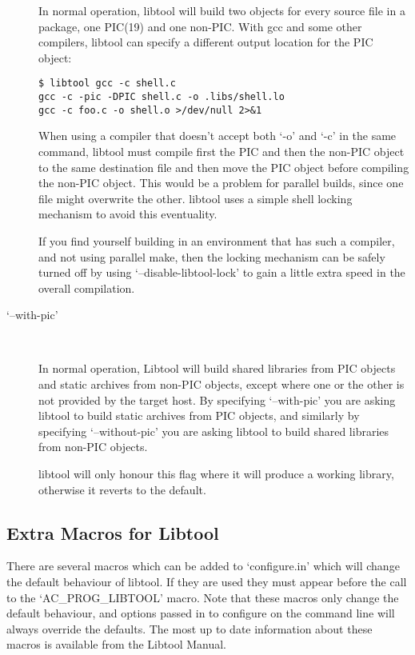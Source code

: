 \begin{description}
%
In normal operation, libtool will build two objects for every source file in a package, one PIC(19) and one non-PIC. With gcc and some other compilers, libtool can specify a different output location for the PIC object: 

\begin{Verbatim}[frame=single]
$ libtool gcc -c shell.c
gcc -c -pic -DPIC shell.c -o .libs/shell.lo
gcc -c foo.c -o shell.o >/dev/null 2>&1
\end{Verbatim}



 When using a compiler that doesn't accept both `-o' and `-c' in the same command, libtool must compile first the PIC and then the non-PIC object to the same destination file and then move the PIC object before compiling the non-PIC object. This would be a problem for parallel builds, since one file might overwrite the other. libtool uses a simple shell locking mechanism to avoid this eventuality. 


If you find yourself building in an environment that has such a compiler, and not using parallel make, then the locking mechanism can be safely turned off by using `--disable-libtool-lock' to gain a little extra speed in the overall compilation. 

\item[`--with-pic']
\ 

%
In normal operation, Libtool will build shared libraries from PIC objects and static archives from non-PIC objects, except where one or the other is not provided by the target host. By specifying `--with-pic' you are asking libtool to build static archives from PIC objects, and similarly by specifying `--without-pic' you are asking libtool to build shared libraries from non-PIC objects. 

libtool will only honour this flag where it will produce a working library, otherwise it reverts to the default. 
\end{description}

\subsection{Extra Macros for Libtool}
There are several macros which can be added to `configure.in' which will 
change the default behaviour of libtool. If they are used they must appear 
before the call to the `AC\_{}PROG\_{}LIBTOOL' macro. Note that these macros 
only change the default behaviour, and options passed in to configure on the 
command line will always override the defaults. The most up to date 
information about these macros is available from the Libtool Manual. 

